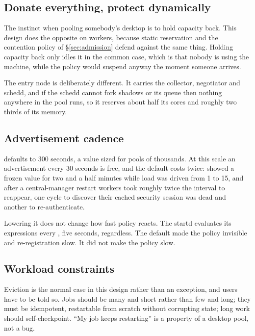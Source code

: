 \subsection{Donate everything, protect dynamically}

The instinct when pooling somebody's desktop is to hold capacity back. This
design does the opposite on workers, because static reservation and the
contention policy of \S\ref{sec:admission} defend against the same thing.
Holding capacity back only idles it in the common case, which is that nobody is
using the machine, while the policy would suspend anyway the moment someone
arrives.

The entry node is deliberately different. It carries the collector, negotiator
and schedd, and if the schedd cannot fork shadows or  its queue then
nothing anywhere in the pool runs, so it reserves about half its cores and
roughly two thirds of its memory.

\subsection{Advertisement cadence}

 defaults to 300 seconds, a value sized for pools of
thousands. At this scale an advertisement every 30 seconds is free, and the
default costs twice:  showed a frozen value for two and a half
minutes while load was driven from 1 to 15, and after a central-manager restart
workers took roughly twice the interval to reappear, one cycle to discover their
cached security session was dead and another to re-authenticate.

Lowering it does not change how fast policy reacts. The startd evaluates its
expressions every , five seconds, regardless. The default
made the policy invisible and re-registration slow. It did not make the policy
slow.

\subsection{Workload constraints}

Eviction is the normal case in this design rather than an exception, and users
have to be told so. Jobs should be many and short rather than few and long; they
must be idempotent, restartable from scratch without corrupting state; long work
should self-checkpoint. ``My job keeps restarting'' is a property of a desktop
pool, not a bug.

